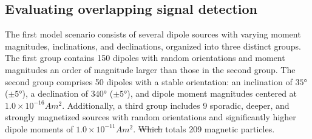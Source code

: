 \documentclass[onecolumn,12pt,a4paper]{article}
\providecommand{\DIFaddtex}[1]{{\protect\color{blue}\uwave{#1}}} %
\providecommand{\DIFdeltex}[1]{{\protect\color{red}\sout{#1}}}                      %
\providecommand{\DIFaddbegin}{} %
\providecommand{\DIFaddend}{} %
\providecommand{\DIFdelbegin}{} %
\providecommand{\DIFdelend}{} %
\providecommand{\DIFadd}[1]{\texorpdfstring{\DIFaddtex{#1}}{#1}} %
\providecommand{\DIFdel}[1]{\texorpdfstring{\DIFdeltex{#1}}{}} %
\newcommand{\DIFscaledelfig}{0.5}
\newlength{\DIFdelgraphicswidth} %
\newlength{\DIFdelgraphicsheight} %
\newcommand{\DIFaddincludegraphics}[2][]{{\color{blue}\fbox{\DIFOincludegraphics[#1]{#2}}}} %
\newcommand{\DIFdelincludegraphics}[2][]{%
\sbox{\DIFdelgraphicsbox}{\DIFOincludegraphics[#1]{#2}}%
\settoboxwidth{\DIFdelgraphicswidth}{\DIFdelgraphicsbox} %
\settoboxtotalheight{\DIFdelgraphicsheight}{\DIFdelgraphicsbox} %
\scalebox{\DIFscaledelfig}{%
\parbox[b]{\DIFdelgraphicswidth}{\usebox{\DIFdelgraphicsbox}\\[-\baselineskip] \rule{\DIFdelgraphicswidth}{0em}}\llap{\resizebox{\DIFdelgraphicswidth}{\DIFdelgraphicsheight}{%
\setlength{\unitlength}{\DIFdelgraphicswidth}%
\begin{picture}(1,1)%
\thicklines\linethickness{2pt} %
{\color[rgb]{1,0,0}\put(0,0){\framebox(1,1){}}}%
{\color[rgb]{1,0,0}\put(0,0){\line( 1,1){1}}}%
{\color[rgb]{1,0,0}\put(0,1){\line(1,-1){1}}}%
\end{picture}%
}\hspace*{3pt}}} %
} %
\DeclareRobustCommand{\DIFaddbegin}{\DIFOaddbegin \let\includegraphics\DIFaddincludegraphics} %
\DeclareRobustCommand{\DIFaddend}{\DIFOaddend \let\includegraphics\DIFOincludegraphics} %
\DeclareRobustCommand{\DIFdelbegin}{\DIFOdelbegin \let\includegraphics\DIFdelincludegraphics} %
\DeclareRobustCommand{\DIFdelend}{\DIFOaddend \let\includegraphics\DIFOincludegraphics} %
\begin{document}
\subsection{Evaluating overlapping signal detection}
\label{sec:synthetic-overlapping}

The first model scenario consists of several dipole sources with varying moment magnitudes, inclinations, and declinations, organized into three distinct groups. The first group contains 150 dipoles with random orientations and moment magnitudes an order of magnitude larger than those in the second group. The second group comprises 50 dipoles with a stable orientation: an inclination of \(\ang{35}\) (\(\pm \ang{5}\)), a declination of \(\ang{340}\) (\(\pm \ang{5}\)), and dipole moment magnitudes centered at \(1.0 \times 10^{-16} Am^2\). Additionally, a third group includes 9 sporadic, deeper, and strongly magnetized sources with random orientations and significantly higher dipole moments of \(1.0 \times 10^{-11} Am^2\). \DIFdelbegin \DIFdel{Which }\DIFdelend \DIFaddbegin \DIFadd{This }\DIFaddend totals 209 magnetic particles.
\end{document}

